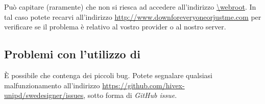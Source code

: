Può capitare (raramente) che non si riesca ad accedere all'indirizzo \url{\webroot}. In tal caso potete recarvi all'indirizzo \url{http://www.downforeveryoneorjustme.com} per verificare se il problema è relativo al vostro provider o al nostro server.



\subsection{Problemi con l'utilizzo di \proj}

È possibile che \proj{} contenga dei piccoli bug. Potete segnalare qualsiasi malfunzionamento all'indirizzo \url{https://github.com/hivex-unipd/swedesigner/issues}, sotto forma di \emph{GitHub issue}.



